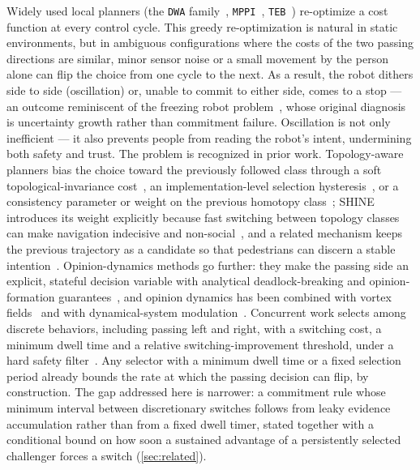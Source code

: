 Widely used local planners (the \texttt{DWA} family~\citep{fox1997dwa}, \texttt{MPPI}~\citep{williams2017mppi}, \texttt{TEB}~\citep{rosmann2017teb}) re-optimize a cost function at every control cycle. This greedy re-optimization is natural in static environments, but in ambiguous configurations where the costs of the two passing directions are similar, minor sensor noise or a small movement by the person alone can flip the choice from one cycle to the next. As a result, the robot dithers side to side (oscillation) or, unable to commit to either side, comes to a stop --- an outcome reminiscent of the freezing robot problem~\citep{trautman2010}, whose original diagnosis is uncertainty growth rather than commitment failure. Oscillation is not only inefficient --- it also prevents people from reading the robot's intent, undermining both safety and trust. The problem is recognized in prior work. Topology-aware planners bias the choice toward the previously followed class through a soft topological-invariance cost~\citep{mavrogiannis2023winding}, an implementation-level selection hysteresis~\citep{rosmann2017teb}, or a consistency parameter or weight on the previous homotopy class~\citep{degroot2024topology,martinezbaselga2026shine}; SHINE introduces its weight explicitly because fast switching between topology classes can make navigation indecisive and non-social~\citep{martinezbaselga2026shine}, and a related mechanism keeps the previous trajectory as a candidate so that pedestrians can discern a stable intention~\citep{zhou2023minimally}. Opinion-dynamics methods go further: they make the passing side an explicit, stateful decision variable with analytical deadlock-breaking and opinion-formation guarantees~\citep{cathcart2023opinion}, and opinion dynamics has been combined with vortex fields~\citep{daddato2024oval} and with dynamical-system modulation~\citep{chen2025socialdsm}. Concurrent work selects among discrete behaviors, including passing left and right, with a switching cost, a minimum dwell time and a relative switching-improvement threshold, under a hard safety filter~\citep{li2026bigcbf}. Any selector with a minimum dwell time or a fixed selection period already bounds the rate at which the passing decision can flip, by construction. The gap addressed here is narrower: a commitment rule whose minimum interval between discretionary switches follows from leaky evidence accumulation rather than from a fixed dwell timer, stated together with a conditional bound on how soon a sustained advantage of a persistently selected challenger forces a switch (\cref{sec:related}).

